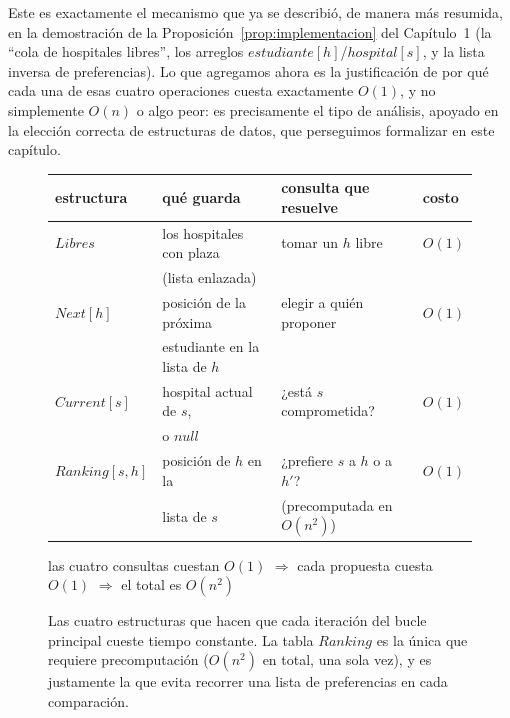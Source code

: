 \documentclass[12pt, spanish, oneside, openany]{book}
\theoremstyle{uprightplain}
\theoremstyle{definition}
\theoremstyle{remark}
\theoremstyle{definition}
\begin{document}
Este es exactamente el mecanismo que ya se describió, de manera más resumida, en la demostración de la Proposición~\ref{prop:implementacion} del Capítulo~1 (la ``cola de hospitales libres'', los arreglos $\mathit{estudiante}[h]$/$\mathit{hospital}[s]$, y la lista inversa de preferencias). Lo que agregamos ahora es la justificación de por qué cada una de esas cuatro operaciones cuesta exactamente $O(1)$, y no simplemente $O(n)$ o algo peor: es precisamente el tipo de análisis, apoyado en la elección correcta de estructuras de datos, que perseguimos formalizar en este capítulo.
\begin{figure}[H]
\centering
\small
\begin{tabular}{@{}llll@{}}
\toprule
\textnormal{estructura} & \textnormal{qué guarda} & \textnormal{consulta que resuelve} & \textnormal{costo} \\
\midrule
$\mathit{Libres}$          & los hospitales con plaza    & tomar un $h$ libre                & $O(1)$ \\
                           & (lista enlazada)            &                                   &        \\[4pt]
$\mathit{Next}[h]$         & posición de la próxima      & elegir a quién proponer           & $O(1)$ \\
                           & estudiante en la lista de $h$ &                                 &        \\[4pt]
$\mathit{Current}[s]$      & hospital actual de $s$,     & ¿está $s$ comprometida?           & $O(1)$ \\
                           & o $\mathit{null}$           &                                   &        \\[4pt]
$\mathit{Ranking}[s,h]$    & posición de $h$ en la       & ¿prefiere $s$ a $h$ o a $h'$?     & $O(1)$ \\
                           & lista de $s$                & (precomputada en $O(n^2)$)        &        \\
\bottomrule
\end{tabular}

\vspace{6pt}
{\small las cuatro consultas cuestan $O(1)$ $\Rightarrow$ cada propuesta cuesta
$O(1)$ $\Rightarrow$ el total es $O(n^2)$}
\caption{Las cuatro estructuras que hacen que cada iteración del bucle
principal cueste tiempo constante. La tabla $\mathit{Ranking}$ es la única que
requiere precomputación ($O(n^2)$ en total, una sola vez), y es justamente la
que evita recorrer una lista de preferencias en cada comparación.}
\label{fig:gs-estructuras}
\end{figure}
\end{document}
